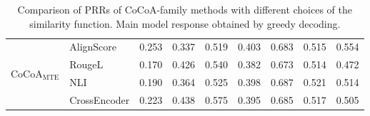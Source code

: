 \documentclass[11pt]{article}
\begin{document}
\begin{table}[htbp]
{\begin{tabular}{ll ccccccc}
\multirow{4}{*}{CoCoA$_{\mathrm{MTE}}$}
 & AlignScore & 0.253 & 0.337 & 0.519 & 0.403 & 0.683 & 0.515 & 0.554 \\
 & RougeL & 0.170 & 0.426 & 0.540 & 0.382 & 0.673 & 0.514 & 0.472 \\
 & NLI & 0.190 & 0.364 & 0.525 & 0.398 & 0.687 & 0.521 & 0.514 \\
 & CrossEncoder & 0.223 & 0.438 & 0.575 & 0.395 & 0.685 & 0.517 & 0.505 \\
\bottomrule
\end{tabular}%
}
\caption{Comparison of PRRs of CoCoA-family methods with different choices of the similarity function. Main model response obtained by greedy decoding.}
\label{tab:cocoa_table5}
\end{table}
\end{document}

